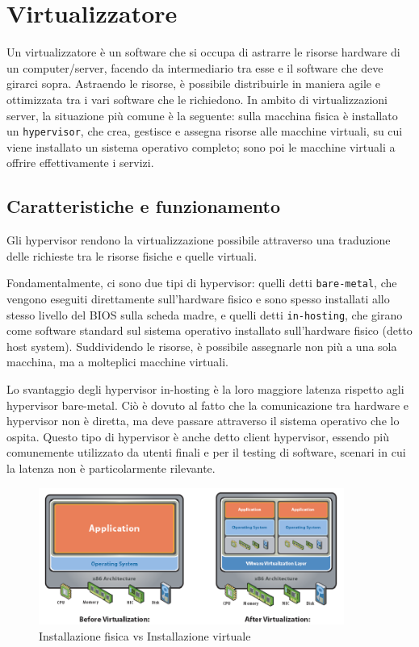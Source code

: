 \section{Virtualizzatore}
Un virtualizzatore è un software che si occupa di astrarre le risorse hardware di un computer/server, facendo da intermediario tra esse e il software che deve girarci sopra. Astraendo le risorse, è possibile distribuirle in maniera agile e ottimizzata tra i vari software che le richiedono.
In ambito di virtualizzazioni server, la situazione più comune è la seguente: sulla macchina fisica è installato un \texttt{hypervisor}, che crea, gestisce e assegna risorse alle macchine virtuali, su cui viene installato un sistema operativo completo; sono poi le macchine virtuali a offrire effettivamente i servizi.

\subsection{Caratteristiche e funzionamento}
Gli hypervisor rendono la virtualizzazione possibile attraverso una traduzione delle richieste tra le risorse fisiche e quelle virtuali.

Fondamentalmente, ci sono due tipi di hypervisor: quelli detti \texttt{bare-metal}, che vengono eseguiti direttamente sull'hardware fisico e sono spesso installati allo stesso livello del BIOS sulla scheda madre, e quelli detti \texttt{in-hosting}, che girano come software standard sul sistema operativo installato sull'hardware fisico (detto host system). Suddividendo le risorse, è possibile assegnarle non più a una sola macchina, ma a molteplici macchine virtuali.

Lo svantaggio degli hypervisor in-hosting è la loro maggiore latenza rispetto agli hypervisor bare-metal. Ciò è dovuto al fatto che la comunicazione tra hardware e hypervisor non è diretta, ma deve passare attraverso il sistema operativo che lo ospita. Questo tipo di hypervisor è anche detto client hypervisor, essendo più comunemente utilizzato da utenti finali e per il testing di software, scenari in cui la latenza non è particolarmente rilevante.

\begin{figure}[ht]
    \centering
    \includegraphics[width=10cm]{figure/virtualization.png}
    \caption{Installazione fisica vs Installazione virtuale}
\end{figure}

